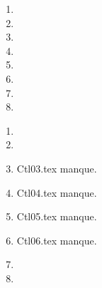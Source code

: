  
 
\begin{enumerate}
  \item  
  \item  
  \item  
  \item  
  \item  
  \item  
  \item  
  \item  
\end{enumerate} 
\clearpage 
{}
\begin{enumerate}
  \item  
  \item  
  \item Ctl03.tex manque. 
  \item Ctl04.tex manque. 
  \item Ctl05.tex manque. 
  \item Ctl06.tex manque. 
  \item  
  \item  
\end{enumerate} 

